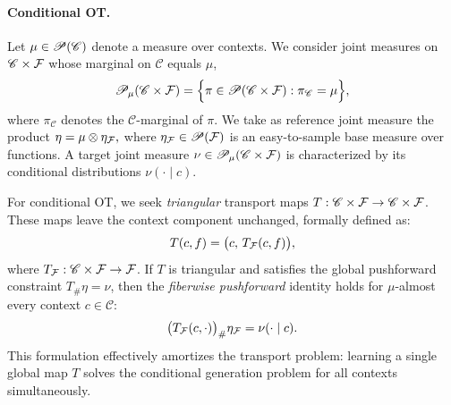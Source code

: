 
%
%

\paragraph{Conditional OT.}
Let $\mu \in \mathscr{P}(\mathscr{C})$ denote a measure over contexts. We consider joint measures on $\mathscr{C} \times \mathcal{F}$ whose marginal on $\mathscr{C}$ equals $\mu$,
\begin{equation}
\mathscr{P}_{\mu}(\mathscr{C} \times \mathcal{F})
=
\Bigl\{\pi \in \mathscr{P}(\mathscr{C} \times \mathcal{F}) : \pi_{\mathscr{C}} = \mu \Bigr\},
\label{eq:Pmu_def}
\end{equation}
where $\pi_{\mathscr{C}}$ denotes the $\mathscr{C}$-marginal of $\pi$. We take as reference joint measure the product $\eta
=
\mu \otimes \eta_{\mathcal{F}},$ where $\eta_{\mathcal{F}} \in \mathscr{P}(\mathcal{F})$ is an easy-to-sample base measure over functions. A target joint measure $\nu \in \mathscr{P}_{\mu}(\mathscr{C} \times \mathcal{F})$ is characterized by its conditional distributions $\nu(\cdot\mid c)$.

For conditional OT, we seek \textit{triangular} transport maps $T: \mathscr{C} \times \mathcal{F} \to \mathscr{C} \times \mathcal{F}$.
%
These maps leave the context component unchanged, formally defined as:
\begin{equation}
T(c,f) = \bigl(c,\, T_{\mathcal{F}}(c,f)\bigr),
\label{eq:triangular_map}
\end{equation}
where $T_{\mathcal{F}}: \mathscr{C} \times \mathcal{F} \to \mathcal{F}$.
%
If $T$ is triangular and satisfies the global pushforward constraint $T_{\#} \eta = \nu$, then the \textit{fiberwise pushforward} identity holds for $\mu$-almost every context $c \in \mathscr{C}$:
\begin{equation}
\bigl(T_{\mathcal{F}}(c,\cdot)\bigr)_{\#} \eta_{\mathcal{F}}
=
\nu(\cdot \mid c).
\label{eq:fiberwise_pushforward}
\end{equation}
This formulation effectively amortizes the transport problem: learning a single global map $T$ solves the conditional generation problem for all contexts simultaneously.

